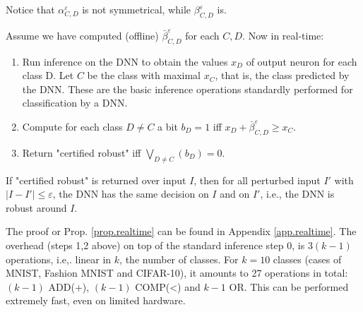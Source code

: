 Notice that  
$\alpha^{\varepsilon}_{C,D}$ is not symmetrical, while 
$\beta^{\varepsilon}_{C,D}$ is.
\fi

    
Assume we have computed (offline) $\bar{\beta}^{\varepsilon}_{C,D}$ for each $C,D$. Now in real-time:
\begin{enumerate}  
  \item[0] Run inference on the DNN to obtain the values $x_D$ of output neuron for each class D. Let $C$ be the class with maximal $x_{C}$, that is, the class predicted by the DNN. These are the basic inference operations standardly performed for classification by a DNN.
  \item[1] Compute for each class $D \neq C$
  a bit $b_D=1$ iff
  $x_D+\bar{\beta}^{\varepsilon}_{C,D} \geq x_C$.
  \item[2] Return "certified robust" iff $\bigvee_{D \neq C}(b_D)=0$.
\end{enumerate}

\begin{proposition}
  \label{prop.realtime}
  If "certified robust" is returned over input $I$, 
  then for all perturbed input $I'$ with  $|I - I'| \leq \varepsilon$,
  the DNN has the same decision on $I$ and on $I'$, i.e., the DNN is robust around $I$. %
\end{proposition}

The proof or Prop. \ref{prop.realtime} can be found in Appendix 
\ref{app.realtime}.
The overhead (steps 1,2 above) on top of the standard inference step 0, is $3(k-1)$ operations, i.e,. linear in $k$, the number of classes.
For $k=10$ classes (cases of MNIST, Fashion MNIST and CIFAR-10), it amounts to 27 operations in total: $(k-1)$ ADD(+), 
$(k-1)$ COMP(<) and $k-1$ OR. This can be performed extremely fast, even on limited hardware.
